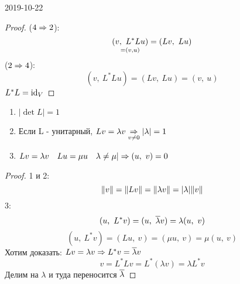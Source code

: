 \documentclass[main]{subfiles}
\begin{document}
\begin{lect} {2019-10-22}
		\begin{proof}
			($4 \Rightarrow 2$):
			\[\underset{=(v,u)}{(v,\ L^*Lu)} = (Lv,\ Lu)\]
			($2 \Rightarrow 4$):
			\[(v,\ L^* L u) = (Lv,\ Lu) = (v,\ u) \]
		    $L^*L = \mathop{\rm id}\nolimits_V$
		\end{proof}

		\begin{utv}
			\begin{enumerate}
				\item $|\det L| = 1$
				\item Если L - унитарный, $Lv = \lambda v \underset{v \neq 0}{\Rightarrow} |\lambda| = 1$
				\item $Lv = \lambda v \quad Lu = \mu u \quad \lambda \neq \mu | \Rightarrow (u,\ v) = 0$
			\end{enumerate}
		\end{utv}

		\begin{proof}
			1 и 2:
			\[\lVert v \rVert = \lVert Lv \rVert = \lVert \lambda v \rVert = |\lambda| \lVert v \rVert\]
			3:
			\[(u,\ L^* v) = (u,\ \ol{\lambda} v) = \lambda (u,\ v)\]
			\[(u,\ L^* v) = (Lu,\ v) = (\mu u,\ v) = \mu(u,\ v)\]
			Хотим доказать: $Lv = \lambda v \Rightarrow L^* v = \overline{\lambda} v$
			\[v = L^* L v = L^* (\lambda v) = \lambda L^* v\]
			Делим на $\lambda$ и туда переносится $\overline{\lambda}$

		\end{proof}
	\end{lect}
\end{document}
